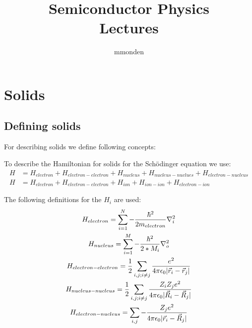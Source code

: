 \documentclass{report}
\title{\Huge{Semiconductor Physics}\\Lectures}
\author{\huge{mmonden}}
\date{}
\begin{document}
\maketitle
\newpage%
\tableofcontents
\pagebreak

\chapter{Solids}
\section{Defining solids}
For describing solids we define following concepts:

To describe the Hamiltonian for solids for the Schödinger equation we use:
\begin{align}
	H &= H_{electron} + H_{electron - electron} + H_{nucleus} + H_{nucleus - nuclues} + H_{electron - nucleus} \\
	H &= H_{electron} + H_{electron - electron} + H_{ion} + H_{ion - ion} + H_{electron - ion}
\end{align} \par
The following definitions for the $H_{i}$ are used:
\begin{gather}
	H_{electron} = \sum_{i = 1}^{N}{-\frac{\hbar^2}{2m_{electron}} \nabla_i^2}\\
	H_{nucleus} = \sum_{i = 1}^{M}{-\frac{\hbar^2}{2*M_i} \nabla_o^2}\\
	H_{electron - electron} = \frac{1}{2} \sum_{i, j; i \neq j}^{}{\frac{e^2}{4 \pi \epsilon_0 \lvert\vec{r}_i - \vec{r}_j\rvert}}\\
	H_{nucleus - nucleus} = \frac{1}{2} \sum_{i, j; i \neq j}^{}{\frac{Z_i Z_j e^2}{4 \pi \epsilon_0 \lvert\vec{R}_i - \vec{R}_j\rvert}}\\
	H_{electron - nucleus} = \sum_{i, j}^{}{-\frac{Z_j e^2}{4 \pi \epsilon_0 \lvert\vec{r}_i - \vec{R}_j\rvert}}
\end{gather}
\end{document}
